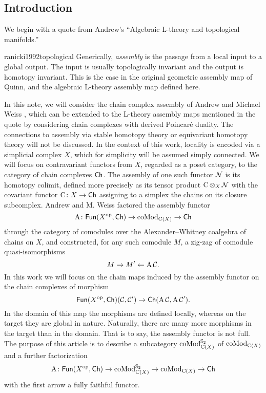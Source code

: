 
\subsection{Introduction} \label{ss:introduction}

We begin with a quote from Andrew's ``Algebraic L-theory and topological manifolds.''
\begin{displaycquote}{ranicki1992topological}
	Generically, \textit{assembly} is the passage from a local input to a global output.
	The input is usually topologically invariant and the output is homotopy invariant.
	This is the case in the original geometric assembly map of Quinn, and the algebraic L-theory assembly map defined here.
\end{displaycquote}
In this note, we will consider the chain complex assembly of Andrew and Michael Weiss \cite{ranicki1990assembly}, which can be extended to the L-theory assembly maps mentioned in the quote by considering chain complexes with derived Poincar\'e duality.
The connections to assembly via stable homotopy theory \cite{weiss1995asssembly} or equivariant homotopy theory \cite{davis1998assembly} will not be discussed.
In the context of this work, locality is encoded via a simplicial complex $X$, which for simplicity will be assumed simply connected.
We will focus on contravariant functors from $X$, regarded as a poset category, to the category of chain complexes $\mathsf{Ch}$.
The assembly of one such functor $\mathcal{N}$ is its homotopy colimit, defined more precisely as its tensor product $\operatorname{C} \operatorname*{\otimes}_X \mathcal{N}$ with the covariant functor $\operatorname{C} \colon X \to \mathsf{Ch}$ assigning to a simplex the chains on its closure subcomplex.
Andrew and M. Weiss factored the assembly functor
\[
\operatorname{A} \colon \mathsf{Fun}(X^{\mathrm{op}}, \mathsf{Ch}) \to \operatorname{coMod}_{\operatorname{C}(X)} \to \mathsf{Ch}
\]
through the category of comodules over the Alexander--Whitney coalgebra of chains on $X$, and constructed, for any such comodule $M$, a zig-zag of comodule quasi-isomorphisms
\[
M \to M' \leftarrow \operatorname{A} \mathcal{C}.
\]
In this work we will focus on the chain maps induced by the assembly functor on the chain complexes of morphism
\[
\mathsf{Fun}(X^{\mathrm{op}},\mathsf{Ch})(\mathcal{C},\mathcal{C}') \to \mathsf{Ch}(\operatorname{A} \mathcal{C}, \operatorname{A} \mathcal{C}').
\]
In the domain of this map the morphisms are defined locally, whereas on the target they are global in nature.
Naturally, there are many more morphisms in the target than in the domain.
That is to say, the assembly functor is not full.
The purpose of this article is to describe a subcategory $\operatorname{coMod}^{\mathbb{S}_2}_{\operatorname{C}(X)}$ of $\operatorname{coMod}_{\operatorname{C}(X)}$ and a further factorization
\[
\operatorname{A} \colon \mathsf{Fun}(X^{\mathrm{op}}, \mathsf{Ch}) \to
\operatorname{coMod}^{\mathbb{S}_2}_{\operatorname{C}(X)} \to
\operatorname{coMod}_{\operatorname{C}(X)} \to
\mathsf{Ch}
\]
with the first arrow a fully faithful functor.

